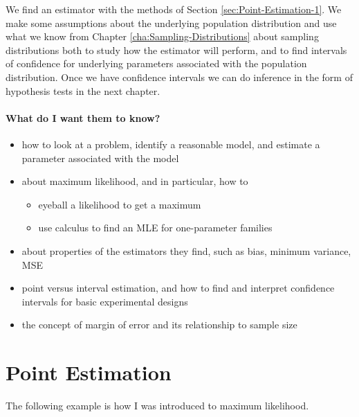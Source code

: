 \documentclass[captions=tableheading]{scrbook}
\begin{document}
We find an estimator with the methods of Section \ref{sec:Point-Estimation-1}. We make some assumptions about the underlying population distribution and use what we know from Chapter \ref{cha:Sampling-Distributions} about sampling distributions both to study how the estimator will perform, and to find intervals of confidence for underlying parameters associated with the population distribution. Once we have confidence intervals we can do inference in the form of hypothesis tests in the next chapter.

\paragraph*{What do I want them to know?}
\begin{itemize}
\item how to look at a problem, identify a reasonable model, and estimate a parameter associated with the model
\item about maximum likelihood, and in particular, how to
\begin{itemize}
\item eyeball a likelihood to get a maximum
\item use calculus to find an MLE for one-parameter families
\end{itemize}
\item about properties of the estimators they find, such as bias, minimum variance, MSE
\item point versus interval estimation, and how to find and interpret confidence intervals for basic experimental designs
\item the concept of margin of error and its relationship to sample size
\end{itemize}
\section{Point Estimation}
\label{sec-9-1}

\label{sec:Point-Estimation-1}

The following example is how I was introduced to maximum likelihood.
\end{document}
